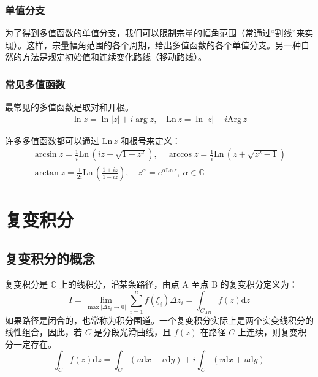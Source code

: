 \documentclass[UTF8]{report}
\def\Arg{\mathrm{Arg}\,}
\def\Ln{\mathrm{Ln\,}}
\def\C{\mathbb{C}}
\theoremstyle{MyLineTheoremStyle} %
\theoremstyle{MyBlockTheoremStyle} %
\theoremstyle{MySubsubsectionStyle} %
\begin{document}
\subsection{单值分支}
为了得到多值函数的单值分支，我们可以限制宗量的幅角范围（常通过“割线”来实现）。这样，宗量幅角范围的各个周期，给出多值函数的各个单值分支。另一种自然的方法是规定初始值和连续变化路线（移动路线）。

\subsection{常见多值函数}
最常见的多值函数是取对和开根。
\begin{gather}
    \ln z = \ln | z | + i\arg z,\quad
    \Ln z = \ln | z | + i\Arg z
    \end{gather}

许多多值函数都可以通过 $\Ln z$ 和根号来定义：
\begin{gather}
    \arcsin z = \frac{1}{i}\Ln (iz + \sqrt{1-z^2} ),\quad
    \arccos z = \frac{1}{i}\Ln (z + \sqrt{z^2 - 1} ) \\
    \arctan z = \frac{1}{2i}\Ln(\frac{1+iz}{1-iz}) ,\quad
    z^\alpha = e^{\alpha \Ln z},\  \alpha \in \C
\end{gather}

    
\chapter{复变积分}

\section{复变积分的概念}
复变积分是 $\C$ 上的线积分，沿某条路径，由点 A 至点 B 的复变积分定义为：
\begin{equation}
I = \lim_{\max | \Delta z_i \to 0|}\sum_{i=1}^{n} f(\xi_i)\Delta z_i = \int_{C_{AB}} f(z) \mathrm{d}z
\end{equation}
如果路径是闭合的，也常称为积分围道。一个复变积分实际上是两个实变线积分的线性组合，因此，若 $C$ 是分段光滑曲线，且 $f(z)$ 在路径 $C$ 上连续，则复变积分一定存在。
\begin{equation}
\int_{C}f(z) \mathrm{d}z = \int_{C}(u \mathrm{d}x - v \mathrm{d}y) + i \int_{C}( v \mathrm{d}x + u \mathrm{d}y)
\end{equation}
\end{document}
